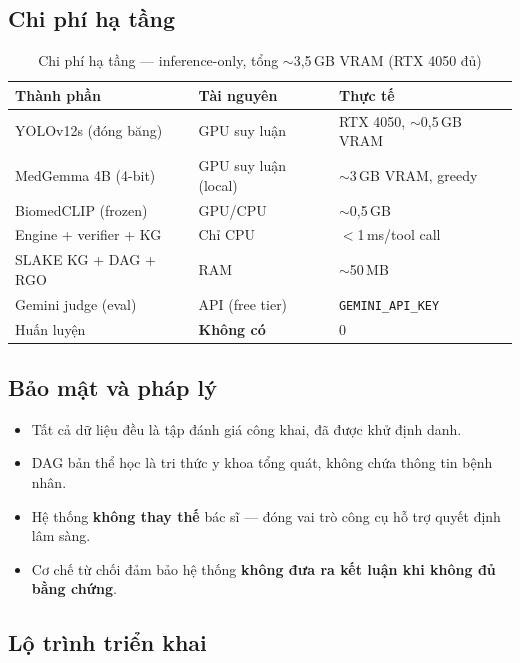 \documentclass[11pt,a4paper]{article}
\begin{document}
\subsection{Chi phí hạ tầng}

\begin{table}[H]
\centering\small
\begin{tabular}{l l l}
\toprule
\textbf{Thành phần} & \textbf{Tài nguyên} & \textbf{Thực tế} \\
\midrule
YOLOv12s (đóng băng) & GPU suy luận & RTX 4050, $\sim$0,5\,GB VRAM \\
MedGemma 4B (4-bit) & GPU suy luận (local) & $\sim$3\,GB VRAM, greedy \\
BiomedCLIP (frozen) & GPU/CPU & $\sim$0,5\,GB \\
Engine + verifier + KG & Chỉ CPU & $<$1\,ms/tool call \\
SLAKE KG + DAG + RGO & RAM & $\sim$50\,MB \\
Gemini judge (eval) & API (free tier) & \texttt{GEMINI\_API\_KEY} \\
Huấn luyện & \textbf{Không có} & 0 \\
\bottomrule
\end{tabular}
\caption{Chi phí hạ tầng --- inference-only, tổng $\sim$3,5\,GB VRAM (RTX 4050 đủ)}
\end{table}

\subsection{Bảo mật và pháp lý}

\begin{itemize}[leftmargin=1.5em]
  \item Tất cả dữ liệu đều là tập đánh giá công khai, đã được khử định danh.
  \item DAG bản thể học là tri thức y khoa tổng quát, không chứa thông tin bệnh nhân.
  \item Hệ thống \textbf{không thay thế} bác sĩ --- đóng vai trò công cụ hỗ trợ quyết định lâm sàng.
  \item Cơ chế từ chối đảm bảo hệ thống \textbf{không đưa ra kết luận khi không đủ bằng chứng}.
\end{itemize}

\subsection{Lộ trình triển khai}
\end{document}
